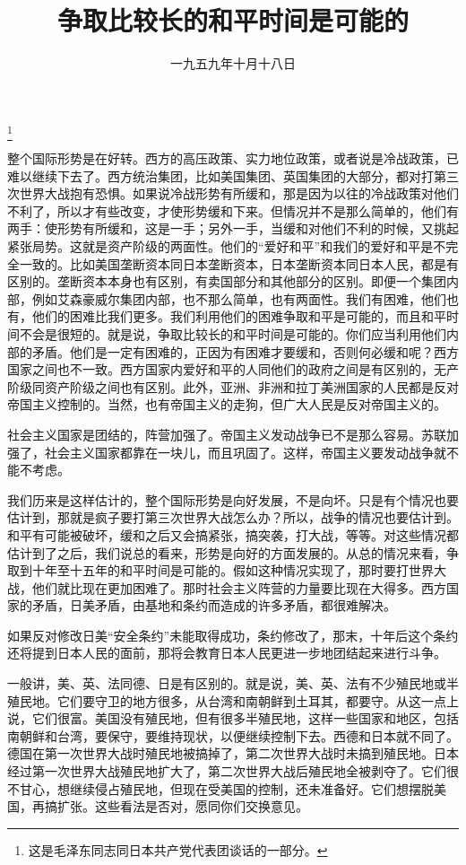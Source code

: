 
\title{争取比较长的和平时间是可能的}
\date{一九五九年十月十八日}
\thanks{这是毛泽东同志同日本共产党代表团谈话的一部分。}
\maketitle


整个国际形势是在好转。西方的高压政策、实力地位政策，或者说是冷战政策，已难以继续下去了。西方统治集团，比如美国集团、英国集团的大部分，都对打第三次世界大战抱有恐惧。如果说冷战形势有所缓和，那是因为以往的冷战政策对他们不利了，所以才有些改变，才使形势缓和下来。但情况并不是那么简单的，他们有两手：使形势有所缓和，这是一手；另外一手，当缓和对他们不利的时候，又挑起紧张局势。这就是资产阶级的两面性。他们的“爱好和平”和我们的爱好和平是不完全一致的。比如美国垄断资本同日本垄断资本，日本垄断资本同日本人民，都是有区别的。垄断资本本身也有区别，有卖国部分和其他部分的区别。即便一个集团内部，例如艾森豪威尔集团内部，也不那么简单，也有两面性。我们有困难，他们也有，他们的困难比我们更多。我们利用他们的困难争取和平是可能的，而且和平时间不会是很短的。就是说，争取比较长的和平时间是可能的。你们应当利用他们内部的矛盾。他们是一定有困难的，正因为有困难才要缓和，否则何必缓和呢？西方国家之间也不一致。西方国家内爱好和平的人同他们的政府之间是有区别的，无产阶级同资产阶级之间也有区别。此外，亚洲、非洲和拉丁美洲国家的人民都是反对帝国主义控制的。当然，也有帝国主义的走狗，但广大人民是反对帝国主义的。

社会主义国家是团结的，阵营加强了。帝国主义发动战争已不是那么容易。苏联加强了，社会主义国家都靠在一块儿，而且巩固了。这样，帝国主义要发动战争就不能不考虑。

我们历来是这样估计的，整个国际形势是向好发展，不是向坏。只是有个情况也要估计到，那就是疯子要打第三次世界大战怎么办？所以，战争的情况也要估计到。和平有可能被破坏，缓和之后又会搞紧张，搞突袭，打大战，等等。对这些情况都估计到了之后，我们说总的看来，形势是向好的方面发展的。从总的情况来看，争取到十年至十五年的和平时间是可能的。假如这种情况实现了，那时要打世界大战，他们就比现在更加困难了。那时社会主义阵营的力量要比现在大得多。西方国家的矛盾，日美矛盾，由基地和条约而造成的许多矛盾，都很难解决。

如果反对修改日美“安全条约”未能取得成功，条约修改了，那末，十年后这个条约还将提到日本人民的面前，那将会教育日本人民更进一步地团结起来进行斗争。

一般讲，美、英、法同德、日是有区别的。就是说，美、英、法有不少殖民地或半殖民地。它们要守卫的地方很多，从台湾和南朝鲜到土耳其，都要守。从这一点上说，它们很富。美国没有殖民地，但有很多半殖民地，这样一些国家和地区，包括南朝鲜和台湾，要保守，要维持现状，以便继续控制下去。西德和日本就不同了。德国在第一次世界大战时殖民地被搞掉了，第二次世界大战时未搞到殖民地。日本经过第一次世界大战殖民地扩大了，第二次世界大战后殖民地全被剥夺了。它们很不甘心，想继续侵占殖民地，但现在受美国的控制，还未准备好。它们想摆脱美国，再搞扩张。这些看法是否对，愿同你们交换意见。

